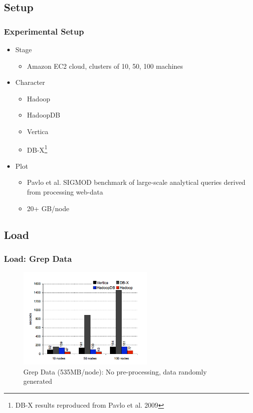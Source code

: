 \documentclass{beamer}
\begin{document}
\subsection{Setup}

\begin{frame}
  \frametitle{Experimental Setup}
  \begin{itemize}
  \item Stage
    \begin{itemize}
    \item Amazon EC2 cloud, clusters of 10, 50, 100 machines
    \end{itemize}
  \item Character
    \begin{itemize}
    \item Hadoop
    \item HadoopDB
    \item Vertica
    \item DB-X\footnote{\small{DB-X results reproduced from Pavlo et al. 2009}}%
   \end{itemize}
  \item Plot
    \begin{itemize}
    \item Pavlo et al. SIGMOD benchmark of large-scale analytical
      queries derived from processing web-data
    \item 20+ GB/node
    \end{itemize}
  \end{itemize}
\end{frame}

\subsection{Load}

\begin{frame}
  \frametitle{Load: Grep Data}
  \begin{figure}
    \centering
    \begin{center}
      \includegraphics[width=0.6\textwidth]{Load-GrepData}
    \end{center}
    \caption{Grep Data (535MB/node): No pre-processing, data randomly generated}
    \label{fig:load-grep-data}
  \end{figure}
\end{frame}
\end{document}
